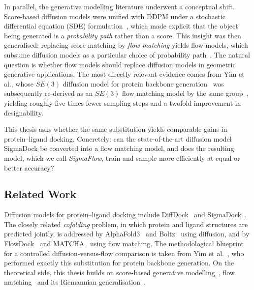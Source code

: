 \documentclass[a4paper,12pt]{article}
\theoremstyle{remark}
\begin{document}
In parallel, the generative modelling literature underwent a conceptual shift.
Score-based diffusion models were unified with DDPM under a stochastic differential
equation (SDE) formulation~\cite{bortoliRiemannianScoreBasedGenerative2022}, which made explicit that the object being
generated is a \emph{probability path} rather than a score. This insight was then
generalised: replacing score matching by \emph{flow matching} yields flow models,
which subsume diffusion models as a particular choice of probability
path~\cite{bortoliRiemannianScoreBasedGenerative2022}. The natural question is whether flow models should replace
diffusion models in geometric generative applications. The most directly relevant
evidence comes from Yim et al., whose $SE(3)$ diffusion model for protein backbone
generation~\cite{bortoliRiemannianScoreBasedGenerative2022} was subsequently re-derived as an $SE(3)$ flow matching
model by the same group~\cite{bortoliRiemannianScoreBasedGenerative2022}, yielding roughly five times fewer sampling
steps and a twofold improvement in designability.

This thesis asks whether the same substitution yields comparable gains in
protein--ligand docking. Concretely: can the state-of-the-art diffusion model
SigmaDock be converted into a flow matching model, and does the resulting model,
which we call \emph{SigmaFlow}, train and sample more efficiently at equal or better accuracy?

\subsection{Related Work}

Diffusion models for protein--ligand docking include DiffDock~\cite{bortoliRiemannianScoreBasedGenerative2022} and
SigmaDock~\cite{bortoliRiemannianScoreBasedGenerative2022}. The closely related \emph{cofolding} problem, in which
protein and ligand structures are predicted jointly, is addressed by
AlphaFold3~\cite{bortoliRiemannianScoreBasedGenerative2022} and Boltz~\cite{bortoliRiemannianScoreBasedGenerative2022} using diffusion, and by
FlowDock~\cite{bortoliRiemannianScoreBasedGenerative2022} and MATCHA~\cite{bortoliRiemannianScoreBasedGenerative2022} using flow matching. The
methodological blueprint for a controlled diffusion-versus-flow comparison is taken
from Yim et al.~\cite{bortoliRiemannianScoreBasedGenerative2022,bortoliRiemannianScoreBasedGenerative2022}, who performed exactly this substitution for
protein backbone generation. On the theoretical side, this thesis builds on
score-based generative modelling~\cite{bortoliRiemannianScoreBasedGenerative2022}, flow matching~\cite{bortoliRiemannianScoreBasedGenerative2022} and
its Riemannian generalisation~\cite{bortoliRiemannianScoreBasedGenerative2022}.
\end{document}
